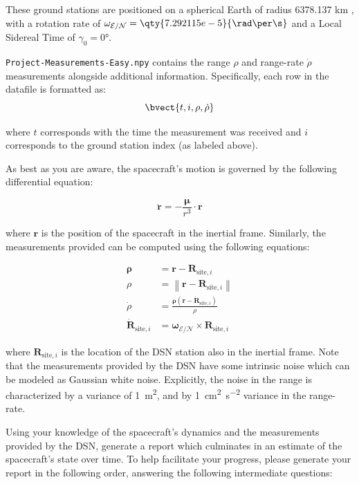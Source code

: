 These ground stations are positioned on a spherical Earth of radius 6378.137 km , with a rotation rate of \( \omega_{\mathcal{E}/\mathcal{N}} = \qty{7.292115e-5}{\rad\per\s} \) and a Local Sidereal Time of \( \gamma_{0} = \ang{0} \).

\texttt{Project-Measurements-Easy.npy} contains the range \( \rho \) and range-rate \( \dot{\rho} \) measurements alongside additional information. Specifically, each row in the datafile is formatted as:
\[
	\bvect{t, i, \rho, \dot{\rho}}
\]

where \( t \) corresponds with the time the measurement was received and \( i \) corresponds to the ground station index (as labeled above).

As best as you are aware, the spacecraft's motion is governed by the following differential equation:

\[
	\ddot{\bm{r}}=-\frac{\bm{\mu}}{r^3} \cdot \bm{r}
\]

where \( \bm{r} \) is the position of the spacecraft in the inertial frame. Similarly, the measurements provided can be computed using the following equations:

\begin{align*}
	\bm{\rho} &= \bm{r} - \bm{R}_{\text{site}, i} \\
	\rho &= \left\| \bm{r} -  \bm{R}_{\text{site}, i} \right\| \\
	\dot{\rho} &= \frac{\bm{\rho} \left( \bm{\dot{r}} - \bm{\dot{R}}_{\text{site}, i} \right)}{\rho} \\
	\bm{\dot{R}}_{\text{site}, i} &= \bm{\omega}_{\mathcal{E} / \mathcal{N}} \times \bm{R}_{\text{site}, i}
\end{align*}

where \( \bm{R}_{\text{site}, i} \) is the location of the DSN station also in the inertial frame. Note that the measurements provided by the DSN have some intrinsic noise which can be modeled as Gaussian white noise. Explicitly, the noise in the range is characterized by a variance of \qty{1}{\m\squared}, and by \qty{1}{\cm\squared\per\s\squared} variance in the range-rate.

Using your knowledge of the spacecraft's dynamics and the measurements provided by the DSN, generate a report which culminates in an estimate of the spacecraft's state over time. To help facilitate your progress, please generate your report in the following order, answering the following intermediate questions:

\newpage

